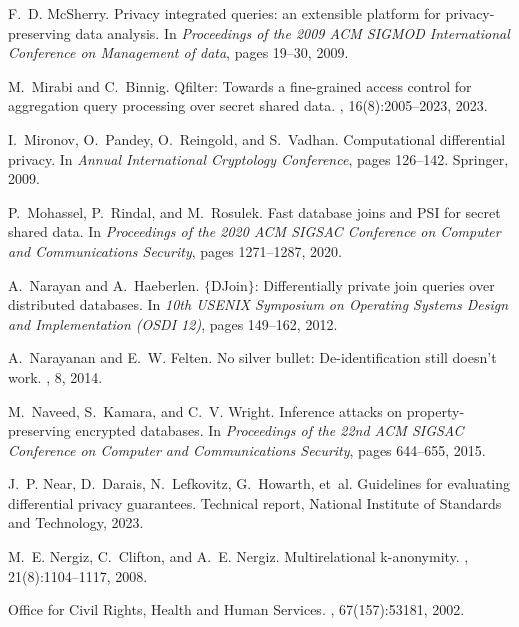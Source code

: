 \documentclass[11pt]{article}
\begin{document}
\begin{thebibliography}{140}
\begin{small}
F.~D. McSherry.
\newblock Privacy integrated queries: an extensible platform for
  privacy-preserving data analysis.
\newblock In {\em Proceedings of the 2009 ACM SIGMOD International Conference
  on Management of data}, pages 19--30, 2009.

M.~Mirabi and C.~Binnig.
\newblock Qfilter: Towards a fine-grained access control for aggregation query
  processing over secret shared data.
, 16(8):2005--2023, 2023.

I.~Mironov, O.~Pandey, O.~Reingold, and S.~Vadhan.
\newblock Computational differential privacy.
\newblock In {\em Annual International Cryptology Conference}, pages 126--142.
  Springer, 2009.

P.~Mohassel, P.~Rindal, and M.~Rosulek.
\newblock Fast database joins and {PSI} for secret shared data.
\newblock In {\em Proceedings of the 2020 ACM SIGSAC Conference on Computer and
  Communications Security}, pages 1271--1287, 2020.

A.~Narayan and A.~Haeberlen.
\newblock $\{$DJoin$\}$: Differentially private join queries over distributed
  databases.
\newblock In {\em 10th USENIX Symposium on Operating Systems Design and
  Implementation (OSDI 12)}, pages 149--162, 2012.

A.~Narayanan and E.~W. Felten.
\newblock No silver bullet: De-identification still doesn’t work.
, 8, 2014.

M.~Naveed, S.~Kamara, and C.~V. Wright.
\newblock Inference attacks on property-preserving encrypted databases.
\newblock In {\em Proceedings of the 22nd ACM SIGSAC Conference on Computer and
  Communications Security}, pages 644--655, 2015.

J.~P. Near, D.~Darais, N.~Lefkovitz, G.~Howarth, et~al.
\newblock Guidelines for evaluating differential privacy guarantees.
\newblock Technical report, National Institute of Standards and Technology,
  2023.

M.~E. Nergiz, C.~Clifton, and A.~E. Nergiz.
\newblock Multirelational k-anonymity.
,
  21(8):1104--1117, 2008.

{Office for Civil Rights, Health and Human Services}.
, 67(157):53181, 2002.


\end{small}
\end{thebibliography}
\end{document}
